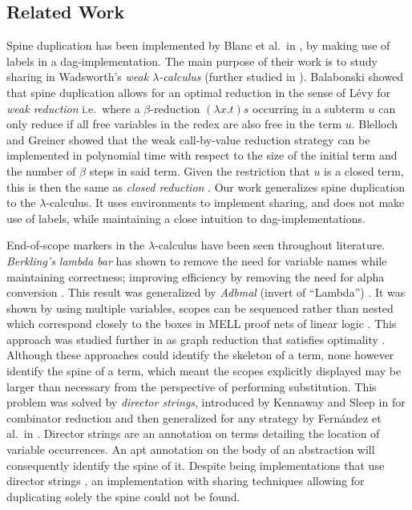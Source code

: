 \documentclass[a4paper,UKenglish,cleveref, autoref]{lipics-v2019}
\begin{document}
\subsection{Related Work}

Spine duplication has been implemented by Blanc et al.\ in \cite{blanc2007sharing}, by making use of labels in a dag-implementation. The main purpose of their work is to study sharing in Wadsworth's \emph{weak $\lambda$-calculus} \cite{wadsworth1971semantics} (further studied in \cite{CAGMAN1998239}). Balabonski \cite{Balabonski12} showed that spine duplication allows for an optimal reduction in the sense of L\'{e}vy \cite{levy1980optimal} for \emph{weak reduction} i.e.\ where a $\beta$-reduction $(\lambda x . t) s$ occurring in a subterm $u$ can only reduce if all free variables in the redex are also free in the term $u$. Blelloch and Greiner \cite{Blelloch:1995:PSF:224164.224210} showed that the weak call-by-value reduction strategy can be implemented in polynomial time with respect to the size of the initial term and the number of $\beta$ steps in said term. Given the restriction that $u$ is a closed term, this is then the same as \emph{closed reduction} \cite{fernandez1999closed, fernandez2005closed}. Our work generalizes spine duplication to the $\lambda$-calculus. It uses environments to implement sharing, and does not make use of labels, while maintaining a close intuition to dag-implementations. 

End-of-scope markers in the $\lambda$-calculus have been seen throughout literature. \emph{Berkling's lambda bar} \cite{berkling1976symmetric} has shown to remove the need for variable names while maintaining correctness; improving efficiency by removing the need for alpha conversion \cite{BERKLING198289}. This result was generalized by \emph{Adbmal} (invert of ``Lambda'') \cite{hendriks2003lambda}. It was shown by using multiple variables, scopes can be sequenced rather than nested which correspond closely to the boxes in MELL proof nets of linear logic \cite{Lafont94fromproof-nets}. This approach was studied further in \cite{van2004lambdascope} as graph reduction that satisfies optimality \cite{levy1980optimal}. Although these approaches could identify the skeleton of a term, none however identify the spine of a term, which meant the scopes explicitly displayed may be larger than necessary from the perspective of performing substitution. This problem was solved by \emph{director strings}, introduced by Kennaway and Sleep in \cite{kennaway1988director} for combinator reduction and then generalized for any strategy by Fern\'{a}ndez et al.\ in \cite{fernandez2005lambda}. Director strings are an annotation on terms detailing the location of variable occurrences. An apt annotation on the body of an abstraction will consequently identify the spine of it. Despite being implementations that use director strings \cite{sinot2003efficient, fernandez2005lambda, fernandez2005closed}, an implementation with sharing techniques allowing for duplicating solely the spine could not be found. 
\end{document}
